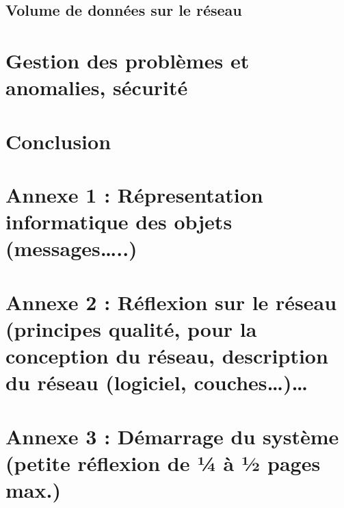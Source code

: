 \subsection{Volume de données sur le réseau}

\section{Gestion des problèmes et anomalies, sécurité}

\section{Conclusion}

\section{Annexe 1 : Répresentation informatique des objets (messages…..)}

\section{Annexe 2 : Réflexion sur le réseau (principes qualité, pour la conception du réseau,
description du réseau (logiciel, couches…)…}

\section{Annexe 3 : Démarrage du système (petite réflexion de ¼ à ½ pages max.)}
